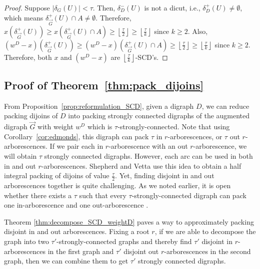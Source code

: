 \documentclass[runningheads]{llncs}
\newcommand{\rounddown}[1]{\left\lfloor#1\right\rfloor}
\begin{document}
\begin{proof}
    Suppose $|\delta_G(U)|< \tau$. Then, $\delta^-_D(U)$ is not a dicut, i.e., $\delta_D^+(U)\neq \emptyset$, which means  $\delta_{\vec{G}}^+(U)\cap A\neq \emptyset$. Therefore, $x(\delta_{\vec{G}}^+(U))\geq x(\delta_{\vec{G}}^+(U)\cap A)\geq \rounddown{\frac{\tau}{2}}\geq \rounddown{\frac{\tau}{k}}$ since $k\geq 2$. Also, $(w^D-x)(\delta_{\vec{G}}^+(U))\geq (w^D-x)(\delta_{\vec{G}}^+(U)\cap A)\geq \rounddown{\frac{\tau}{2}}\geq \rounddown{\frac{\tau}{k}}$ since $k\geq 2$. Therefore, both $x$ and $(w^D-x)$ are $\rounddown{\frac{\tau}{k}}$-SCD's.
\end{proof}



\subsection*{Proof of Theorem~\ref{thm:pack_dijoins}}
From Proposition~\ref{prop:reformulation_SCD}, given a digraph $D$, we can reduce packing dijoins of $D$ into packing strongly connected digraphs of the augmented digraph $\vec{G}$ with weight $w^D$ which is $\tau$-strongly-connected.
Note that using Corollary~\ref{cor:edmonds}, this digraph can pack $\tau$ in $r$-arborescences, or $\tau$ out $r$-arborescences. If we pair each in $r$-arborescence with an out $r$-arborescence, we will obtain $\tau$ strongly connected digraphs. However, each arc can be used in both in and out $r$-arborescences. Shepherd and Vetta \cite{shepherd2005visualizing} use this idea to obtain a half integral packing of dijoins of value $\frac{\tau}{2}$. Yet, finding disjoint in and out arborescences together is quite challenging. As we noted earlier, it is open whether there exists a $\tau$ such that every $\tau$-strongly-connected digraph can pack one in-arborescence and one out-arborescence \cite{bang2009disjoint}.  

Theorem \ref{thm:decompose_SCD_weightD} paves a way to approximately packing disjoint in and out arborescences. Fixing a root $r$, if we are able to decompose the graph into two $\tau'$-strongly-connected graphs and thereby find $\tau'$ disjoint in $r$-arborescences in the first graph and $\tau'$ disjoint out $r$-arborescences in the second graph, then we can combine them to get $\tau'$ strongly connected digraphs. 
\end{document}
